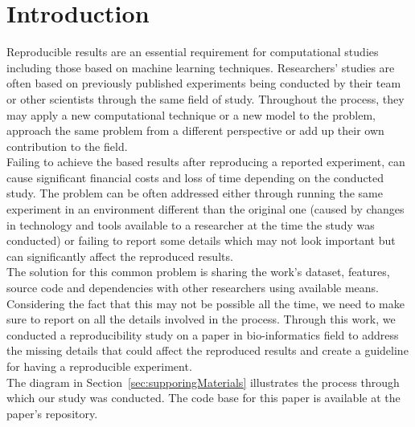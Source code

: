 \section {Introduction}


Reproducible results are an essential requirement for computational studies including those based on machine learning techniques. 
Researchers' studies are often based on previously published experiments being conducted by their team or other scientists 
through the same field of study. 
Throughout the process, they may apply a new computational technique or a new model to the problem, 
approach the same problem from a different perspective or add up their own contribution to the field. \\

Failing to achieve the based results after reproducing a reported experiment, can cause significant financial costs 
and loss of time depending on the conducted study. The problem can be often addressed either through running the same 
experiment in an environment different than the original one (caused by changes in technology and tools available to a 
researcher at the time the study was conducted) or failing to report some details which may not look important but 
can significantly affect the reproduced results. \\

The solution for this common problem is sharing the work's dataset, features, source code and dependencies with other 
researchers using available means. Considering the fact that this may not be possible all the time, we need to make 
sure to report on all the details involved in the process. Through this work, we conducted a reproducibility study on a paper 
in bio-informatics field to address the missing details that could affect the reproduced results and create a guideline for 
having a reproducible experiment.\\

The diagram in Section~\ref{sec:supporingMaterials} illustrates the process through which our study was conducted. The code base for 
this paper is available at the paper's  repository.
